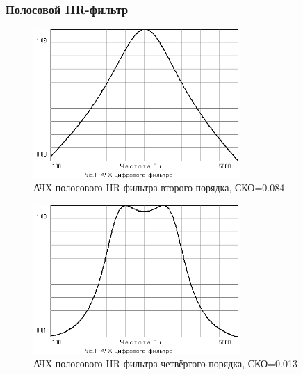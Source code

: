 \subsubsection{Полосовой IIR-фильтр}
\begin{figure}[H]
  \centering
  \includegraphics[width=0.7\textwidth]{data/Z1_PPF/gain_IIR2P.png}
  \caption{АЧХ полосового IIR-фильтра второго порядка, СКО=0.084}
  \label{fig:IIR_2p}
\end{figure}
\begin{figure}[H]
  \centering
  \includegraphics[width=0.7\textwidth]{data/Z1_PPF/gain_IIR4P.png}
  \caption{АЧХ полосового IIR-фильтра четвёртого порядка, СКО=0.013}
  \label{fig:IIR_4p}
\end{figure}



